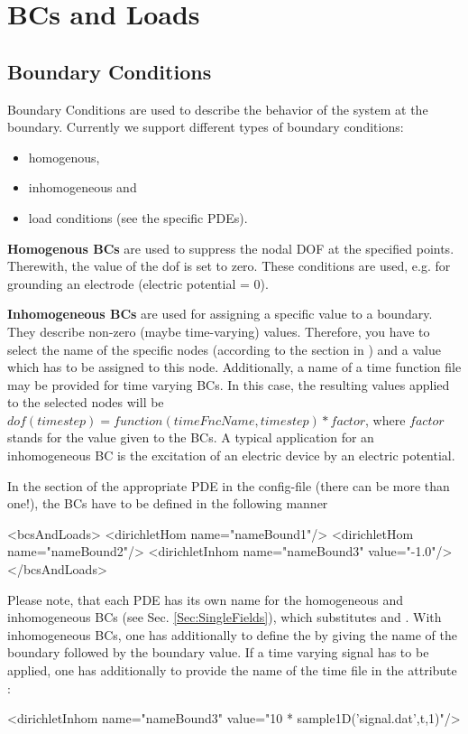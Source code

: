 \chapter{BCs and Loads}
\section{Boundary Conditions}
Boundary Conditions are used to describe the behavior of the system at
the boundary. Currently we support different types of boundary
conditions: 

\begin{itemize}
\item homogenous,
\item inhomogeneous and
\item load conditions (see the specific PDEs).
\end{itemize}

{\bf Homogenous BCs} are used to suppress the nodal DOF at the specified
points. Therewith, the value of the dof is set to zero. These
conditions are used, e.g. for grounding an electrode (electric potential
= 0).

{\bf Inhomogeneous BCs}  are used for assigning a
  specific value to a boundary. They describe non-zero (maybe
  time-varying) values.  Therefore, you have to select the name of the
  specific nodes (according to the section  in
) and a value which has to be assigned to this node.
  Additionally, a name of a time function file may be provided for
  time varying BCs. In this case, the resulting values applied to the
  selected nodes will be ${dof}(timestep) =
  function(timeFncName,timestep)*factor$, where $factor$ stands for
  the value given to the BCs. A typical application for an
  inhomogeneous BC is the excitation of an electric device by an
  electric potential.

\bigskip

In the section   of the appropriate PDE in the
config-file (there can be more than one!), the BCs have to be defined
in the following manner
\begin{xmllisting}
  <bcsAndLoads>
     <dirichletHom   name="nameBound1"/>
     <dirichletHom   name="nameBound2"/>
     <dirichletInhom name="nameBound3" value="-1.0"/>
  </bcsAndLoads>
\end{xmllisting}

Please note, that each PDE has its own name for the homogeneous and
inhomogeneous BCs (see Sec. \ref{Sec:SingleFields}), which substitutes
 and .
With inhomogeneous BCs, one has additionally to define the  by
giving the name of the boundary followed by the boundary value. If a
time varying signal has to be applied, one has additionally to provide
the name of the time file in the attribute { }:
\begin{xmllisting}
  <dirichletInhom name="nameBound3" value="10 * sample1D('signal.dat',t,1)"/>
\end{xmllisting}


